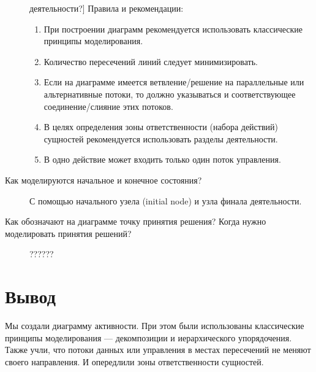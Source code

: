 \begin{description}
		деятельности?]
		Правила и рекомендации:
		\begin{enumerate}
			\item При построении диаграмм рекомендуется использовать
				классические принципы моделирования.
			\item Количество пересечений линий следует минимизировать.
			\item Если на диаграмме имеется ветвление/решение на параллельные
				или альтернативные потоки, то должно указываться
				и соответствующее соединение/слияние этих потоков.
			\item В целях определения зоны ответственности (набора действий)
				сущностей рекомендуется использовать разделы деятельности.
			\item В одно действие может входить только один поток управления.
		\end{enumerate}
	\item [Как моделируются начальное и конечное состояния?]
		С помощью начального узела (initial node) и узла финала деятельности.
	\item [Как обозначают на диаграмме точку принятия решения? Когда
		нужно моделировать принятия решений?]
		??????
\end{description}

\clearpage

\section*{\LARGE Вывод}
Мы создали диаграмму активности.
При этом были использованы классические
принципы моделирования --- декомпозиции и иерархического упорядочения.
Также учли, что потоки данных или управления в местах пересечений не
меняют своего направления. И опередлили зоны ответственности сущностей.

